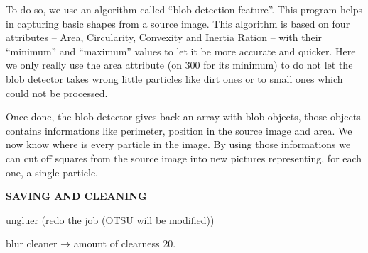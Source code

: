 	To do so, we use an algorithm called “blob detection feature”. This program helps in capturing basic shapes from a source image. This algorithm is based on four attributes – Area, Circularity, Convexity and Inertia Ration – with their “minimum” and “maximum” values to let it be more accurate and quicker. Here we only really use the area attribute (on 300 for its minimum) to do not let the blob detector takes wrong little particles like dirt ones or to small ones which could not be processed.
	
	Once done, the blob detector gives back an array with blob objects, those objects contains informations like perimeter, position in the source image and area. We now know where is every particle in the image. By using those informations we can cut off squares from the source image into new pictures representing, for each one, a single particle.

\textbf{SAVING AND CLEANING}

ungluer (redo the job (OTSU will be modified))

blur cleaner → amount of clearness 20.
    
    
    